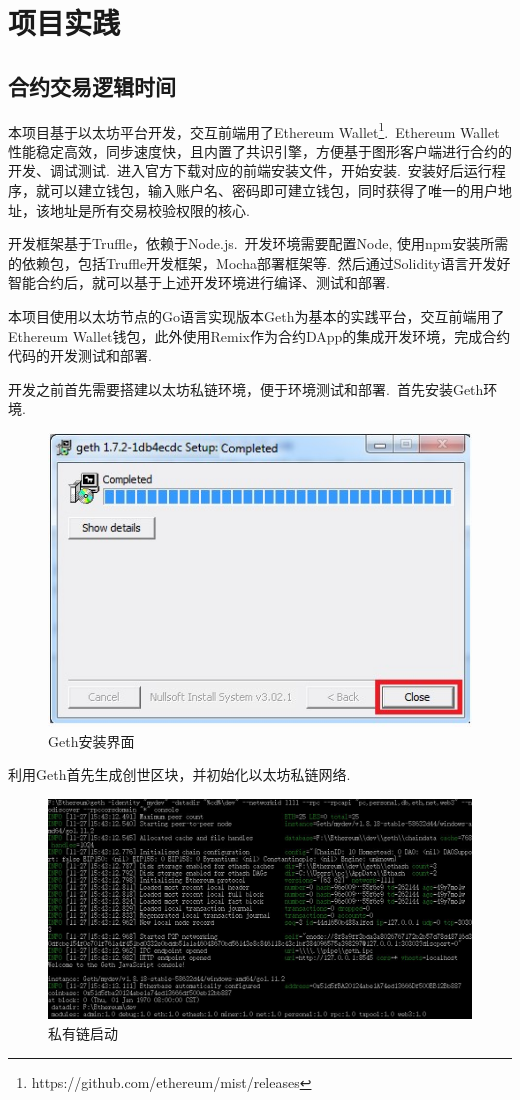 \documentclass[a4paper,12pt,titlepage]{ctexart}
\begin{document}
\newpage
\section{项目实践}
\subsection{合约交易逻辑时间}
本项目基于以太坊平台开发，交互前端用了Ethereum Wallet\footnote{\mbox{https://github.com/ethereum/mist/releases}}.~Ethereum Wallet性能稳定高效，同步速度快，且内置了共识引擎，方便基于图形客户端进行合约的开发、调试测试.~进入官方下载对应的前端安装文件，开始安装.~安装好后运行程序，就可以建立钱包，输入账户名、密码即可建立钱包，同时获得了唯一的用户地址，该地址是所有交易校验权限的核心.~\par
开发框架基于Truffle，依赖于Node.js.~开发环境需要配置Node, 使用npm安装所需的依赖包，包括Truffle开发框架，Mocha部署框架等.~然后通过Solidity语言开发好智能合约后，就可以基于上述开发环境进行编译、测试和部署.~\par
本项目使用以太坊节点的Go语言实现版本Geth为基本的实践平台，交互前端用了Ethereum Wallet钱包，此外使用Remix作为合约DApp的集成开发环境，完成合约代码的开发测试和部署.~\par
开发之前首先需要搭建以太坊私链环境，便于环境测试和部署.~首先安装Geth环境.~\par
\begin{figure}[!hbp]
	\centering
	\includegraphics[scale=0.80]{fig21.jpg}
	\caption{Geth安装界面}
\end{figure}
利用Geth首先生成创世区块，并初始化以太坊私链网络.~\par
\newpage
\begin{figure}[!hbp]
	\centering
	\includegraphics[scale=0.5]{fig19.jpg}
	\caption{私有链启动}
\end{figure}
\end{document}
